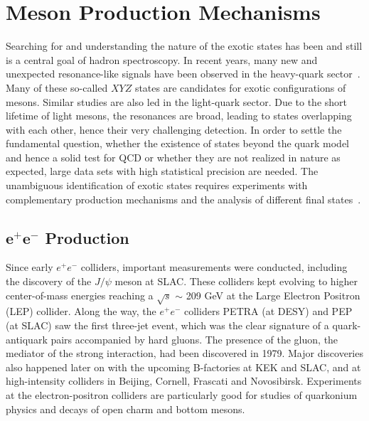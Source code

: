 \section{Meson Production Mechanisms}
\label{p.1.3}

Searching for and understanding the nature of the exotic states has been and still is a central goal of hadron spectroscopy. In recent years, many new and unexpected resonance-like signals have been observed in the heavy-quark sector~\cite{Tanabashi18}. Many of these so-called $XYZ$ states are candidates for exotic configurations of mesons. Similar studies are also led in the light-quark sector. Due to the short lifetime of light mesons, the resonances are broad, leading to states overlapping with each other, hence their very challenging detection. In order to settle the fundamental question, whether the existence of states beyond the quark model and hence a solid test for QCD or whether they are not realized in nature as expected, large data sets with high statistical precision are needed. The unambiguous identification of exotic states requires experiments with complementary production mechanisms and the analysis of different final states~\cite{Szczepaniak01}.
 
\subsection{\texorpdfstring{$\bm{e^{+}e^{-}}$}{} Production}

Since early $e^{+}e^{-}$ colliders, important measurements were conducted, including the discovery of the $J/\psi$ meson at SLAC. These colliders kept evolving to higher center-of-mass energies reaching a $\sqrt{s}$ $\sim$ 209 GeV at the Large Electron Positron (LEP) collider. Along the way, the $e^{+}e^{-}$ colliders PETRA (at DESY) and PEP (at SLAC) saw the first three-jet event, which was the clear signature of a quark-antiquark pairs accompanied by hard gluons. The presence of the gluon, the mediator of the strong interaction, had been discovered in 1979. Major discoveries also happened later on with the upcoming B-factories at KEK and SLAC, and at high-intensity colliders in Beijing, Cornell, Frascati and Novosibirsk. Experiments at the electron-positron colliders are particularly good for studies of quarkonium physics and decays of open charm and bottom mesons.

